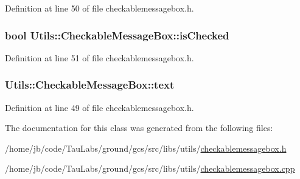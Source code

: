 \-Definition at line 50 of file checkablemessagebox.\-h.

\hypertarget{class_utils_1_1_checkable_message_box_a344ff6c020a0351070685083aba8c3ab}{
\subsubsection[{is\-Checked}]{\setlength{\rightskip}{0pt plus 5cm}bool {\bf \-Utils\-::\-Checkable\-Message\-Box\-::is\-Checked}}}\label{class_utils_1_1_checkable_message_box_a344ff6c020a0351070685083aba8c3ab}


\-Definition at line 51 of file checkablemessagebox.\-h.

\hypertarget{class_utils_1_1_checkable_message_box_a2fa5240368beedd12fb217a593410aae}{
\subsubsection[{text}]{ {\bf \-Utils\-::\-Checkable\-Message\-Box\-::text}}}\label{class_utils_1_1_checkable_message_box_a2fa5240368beedd12fb217a593410aae}


\-Definition at line 49 of file checkablemessagebox.\-h.



\-The documentation for this class was generated from the following files\-:\begin{DoxyCompactItemize}
\item 
/home/jb/code/\-Tau\-Labs/ground/gcs/src/libs/utils/\hyperlink{checkablemessagebox_8h}{checkablemessagebox.\-h}\item 
/home/jb/code/\-Tau\-Labs/ground/gcs/src/libs/utils/\hyperlink{checkablemessagebox_8cpp}{checkablemessagebox.\-cpp}\end{DoxyCompactItemize}
